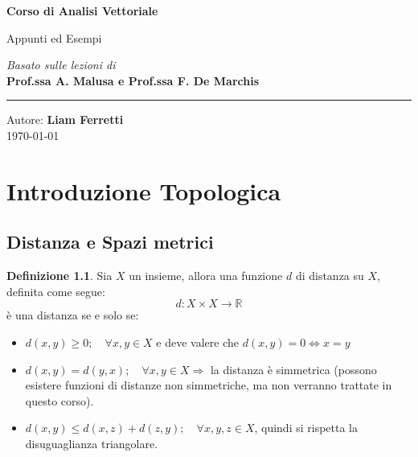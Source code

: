 \documentclass[11pt, a4paper, openright]{book}
\theoremstyle{plain}
\theoremstyle{definition}
\newtheorem{definizione}[teorema]{Definizione}
\theoremstyle{remark}
\begin{document}
\begin{titlepage}
    \centering
    \vspace*{4cm}
    
    \Huge
    \textbf{Corso di Analisi Vettoriale}
    
    \vspace{0.5cm}
    \LARGE
    Appunti ed Esempi
    
    \vspace{1.5cm}
    
    \textit{Basato sulle lezioni di} \\
    \Large \textbf{Prof.ssa A. Malusa e Prof.ssa F. De Marchis}
    
    \vfill
    
    \rule{\linewidth}{0.5pt}
    \vspace{0.5cm}
    
    \large
    Autore: \textbf{Liam Ferretti} \\
    \today
    
\end{titlepage}

\tableofcontents

\chapter{Introduzione Topologica}
\section{Distanza e Spazi metrici}

\begin{definizione}
Sia $X$ un insieme, allora una funzione $d$ di distanza su $X$, definita come segue:
\begin{equation}
    d: X \times X \longrightarrow \mathbb{R}
\end{equation}
è una distanza se e solo se:
\begin{itemize}
    \item $d(x, y) \geq 0 ; \quad \forall x, y \in X$ e deve valere che $d(x, y) = 0 \iff x = y$
    \item $d(x, y) = d(y, x); \quad \forall x, y \in X \Longrightarrow$ la distanza è simmetrica (possono esistere funzioni di distanze non simmetriche, ma non verranno trattate in questo corso).
    \item $d(x, y) \leq d(x, z) + d(z, y); \quad \forall x, y,z \in X$, quindi si rispetta la disuguaglianza triangolare.
\end{itemize}
\end{definizione}
\end{document}
